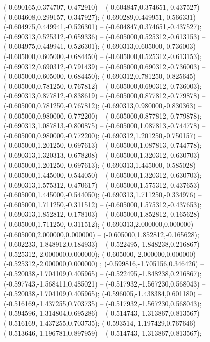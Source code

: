  (-0.690165,0.374707,-0.472910) -- (-0.604847,0.374651,-0.437527) -- (-0.604608,0.299157,-0.347927);
 (-0.690289,0.449951,-0.566331) -- (-0.604975,0.449941,-0.526301) -- (-0.604847,0.374651,-0.437527);
 (-0.690313,0.525312,-0.659336) -- (-0.605000,0.525312,-0.613153) -- (-0.604975,0.449941,-0.526301);
 (-0.690313,0.605000,-0.736003) -- (-0.605000,0.605000,-0.684450) -- (-0.605000,0.525312,-0.613153);
 (-0.690312,0.690312,-0.791439) -- (-0.605000,0.690312,-0.736003) -- (-0.605000,0.605000,-0.684450);
 (-0.690312,0.781250,-0.825645) -- (-0.605000,0.781250,-0.767812) -- (-0.605000,0.690312,-0.736003);
 (-0.690313,0.877812,-0.838619) -- (-0.605000,0.877812,-0.779878) -- (-0.605000,0.781250,-0.767812);
 (-0.690313,0.980000,-0.830363) -- (-0.605000,0.980000,-0.772200) -- (-0.605000,0.877812,-0.779878);
 (-0.690313,1.087813,-0.800875) -- (-0.605000,1.087813,-0.744778) -- (-0.605000,0.980000,-0.772200);
 (-0.690312,1.201250,-0.750157) -- (-0.605000,1.201250,-0.697613) -- (-0.605000,1.087813,-0.744778);
 (-0.690313,1.320313,-0.678208) -- (-0.605000,1.320312,-0.630703) -- (-0.605000,1.201250,-0.697613);
 (-0.690313,1.445000,-0.585028) -- (-0.605000,1.445000,-0.544050) -- (-0.605000,1.320312,-0.630703);
 (-0.690313,1.575312,-0.470617) -- (-0.605000,1.575312,-0.437653) -- (-0.605000,1.445000,-0.544050);
 (-0.690313,1.711250,-0.334976) -- (-0.605000,1.711250,-0.311512) -- (-0.605000,1.575312,-0.437653);
 (-0.690313,1.852812,-0.178103) -- (-0.605000,1.852812,-0.165628) -- (-0.605000,1.711250,-0.311512);
 (-0.690313,2.000000,0.000000) -- (-0.605000,2.000000,0.000000) -- (-0.605000,1.852812,-0.165628);
 (-0.602233,-1.848912,0.184933) -- (-0.522495,-1.848238,0.216867) -- (-0.525312,-2.000000,0.000000);
 (-0.605000,-2.000000,0.000000) -- (-0.525312,-2.000000,0.000000) ;
 (-0.599816,-1.705156,0.346426) -- (-0.520038,-1.704109,0.405965) -- (-0.522495,-1.848238,0.216867);
 (-0.597743,-1.568411,0.485021) -- (-0.517932,-1.567230,0.568043) -- (-0.520038,-1.704109,0.405965);
 (-0.596005,-1.438384,0.601180) -- (-0.516169,-1.437255,0.703735) -- (-0.517932,-1.567230,0.568043);
 (-0.594596,-1.314804,0.695286) -- (-0.514743,-1.313867,0.813567) -- (-0.516169,-1.437255,0.703735);
 (-0.593514,-1.197429,0.767646) -- (-0.513646,-1.196781,0.897959) -- (-0.514743,-1.313867,0.813567);
